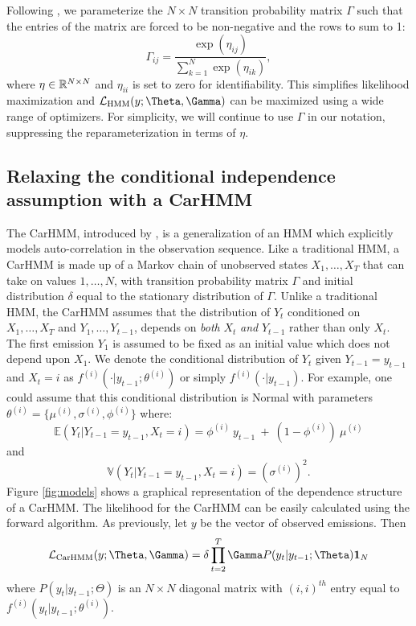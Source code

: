 Following \citet{Barajas:2017}, we parameterize the $N \times N$ transition probability matrix $\Gamma$ such that the entries of the matrix are forced to be non-negative and the rows to sum to 1:
%
\[
\Gamma_{ij} = \frac{\exp(\eta_{ij})}{\sum_{k=1}^N \exp(\eta_{ik})}, 
\]
%
where $\eta \in \mathbb{R}^{N \times N}$ and $\eta_{ii}$ is set to zero for identifiability. This simplifies likelihood maximization and $\calL_{\text{HMM}}(y;\Theta,\Gamma)$ can be maximized using a wide range of optimizers. For simplicity, we will continue to use $\Gamma$ in our notation, suppressing the reparameterization in terms of  $\eta$.


\subsection{Relaxing the conditional independence assumption with a CarHMM}

The CarHMM, introduced by \citet{Lawler:2019}, is a generalization of an HMM which explicitly models auto-correlation in the observation sequence. Like a traditional HMM, a CarHMM is made up of a Markov chain of unobserved states $X_1,\ldots, X_T$ that can take on values $1, \ldots, N$, with transition probability matrix $\Gamma$ and initial distribution $\delta$ equal to the stationary distribution of $\Gamma$. Unlike a traditional HMM, the CarHMM assumes that the distribution of $Y_t$ conditioned on $X_1,\ldots, X_T$ and $Y_1,\ldots, Y_{t-1}$, depends on \textit{both} $X_t$ \textit{and} $Y_{t-1}$ rather than only $X_t$. 
The first emission $Y_1$ is assumed to be fixed as an initial value which does not depend upon $X_1$.
%
We denote the conditional distribution of $Y_t$ given $Y_{t-1}= y_{t-1}$ and $X_t=i$ as $f^{(i)}( \cdot | y_{t-1}; \theta^{(i)})$ or simply $f^{(i)}( \cdot | y_{t-1})$.
For example, one could assume that this conditional distribution is Normal with parameters $\theta^{(i)} = \{\mu^{(i)},\sigma^{(i)},\phi^{(i)}\}$ where:
%
\[
\mathbb{E}(Y_t|Y_{t-1} = y_{t-1},X_t=i) = \phi^{(i)} ~ y_{t-1} ~+ ~(1-\phi^{(i)})  ~\mu^{(i)}
\]
and
\[
\mathbb{V}(Y_t| Y_{t-1} =y_{t-1}, X_t = i) = (\sigma^{(i)})^2.
\]
%
Figure \ref{fig:models} shows a graphical representation of the dependence structure of a CarHMM. The likelihood for the CarHMM can be easily calculated using the forward algorithm. As previously, let $y$ be the vector of observed emissions. Then
\begin{equation}
    \calL_{\text{CarHMM}}(y;\Theta,\Gamma) = \delta \prod_{t=2}^T \Gamma P(y_t|y_{t-1};\Theta) \mathbf{1}_N
    \label{CarHMM_likelihood}
\end{equation}
where
%
$P(y_t|y_{t-1};\Theta)$ is an $N \times N$ diagonal matrix with $(i,i)^{th}$ entry equal to $f^{(i)}(y_t|y_{t-1}; \theta^{(i)})$.

